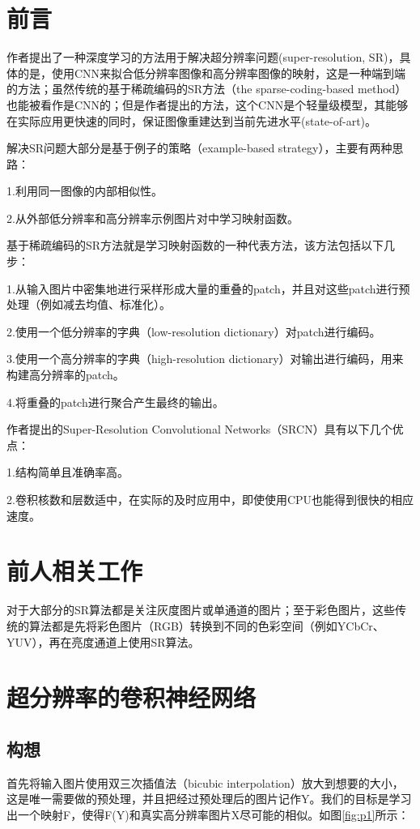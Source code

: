 \documentclass[UTF8,a4paper,10pt]{ctexrep}
\begin{document}
\section{前言}
作者提出了一种深度学习的方法用于解决超分辨率问题(super-resolution, SR)，具体的是，使用CNN来拟合低分辨率图像和高分辨率图像的映射，这是一种端到端的方法；虽然传统的基于稀疏编码的SR方法（the sparse-coding-based method）也能被看作是CNN的；但是作者提出的方法，这个CNN是个轻量级模型，其能够在实际应用更快速的同时，保证图像重建达到当前先进水平(state-of-art)。

解决SR问题大部分是基于例子的策略（example-based strategy），主要有两种思路：

1.利用同一图像的内部相似性。

2.从外部低分辨率和高分辨率示例图片对中学习映射函数。

基于稀疏编码的SR方法就是学习映射函数的一种代表方法，该方法包括以下几步：

1.从输入图片中密集地进行采样形成大量的重叠的patch，并且对这些patch进行预处理（例如减去均值、标准化）。

2.使用一个低分辨率的字典（low-resolution dictionary）对patch进行编码。

3.使用一个高分辨率的字典（high-resolution dictionary）对输出进行编码，用来构建高分辨率的patch。

4.将重叠的patch进行聚合产生最终的输出。

作者提出的Super-Resolution Convolutional Networks（SRCN）具有以下几个优点：

1.结构简单且准确率高。

2.卷积核数和层数适中，在实际的及时应用中，即使使用CPU也能得到很快的相应速度。

\section{前人相关工作}

对于大部分的SR算法都是关注灰度图片或单通道的图片；至于彩色图片，这些传统的算法都是先将彩色图片（RGB）转换到不同的色彩空间（例如YCbCr、YUV），再在亮度通道上使用SR算法。


\section{超分辨率的卷积神经网络}

\subsection{构想}
首先将输入图片使用双三次插值法（bicubic interpolation）放大到想要的大小，这是唯一需要做的预处理，并且把经过预处理后的图片记作Y。我们的目标是学习出一个映射F，使得F(Y)和真实高分辨率图片X尽可能的相似。如图\ref{fig:p1}所示：
\end{document}

